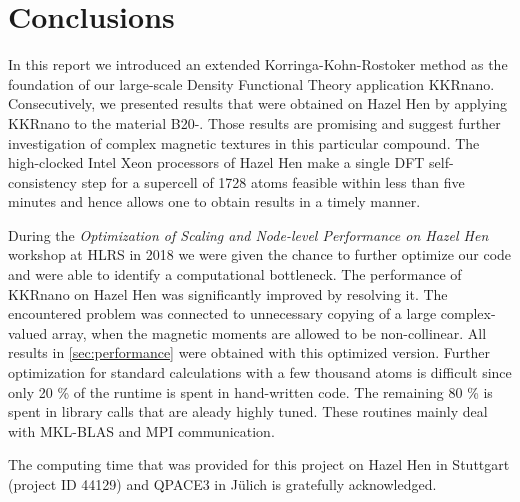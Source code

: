 \documentclass[graybox]{svmult}
\begin{document}
\section{Conclusions}
In this report we introduced an extended Korringa-Kohn-Rostoker method as the foundation of our large-scale
Density Functional Theory application KKRnano. 
Consecutively, we presented results that were obtained on Hazel Hen 
by applying KKRnano to the material B20-.
Those results are promising and suggest further investigation
of complex magnetic textures in this particular compound.
The high-clocked Intel Xeon processors of Hazel Hen
make a single DFT self-consistency step for a supercell of 1728 atoms feasible within 
less than five minutes and hence allows one
to obtain results in a timely manner.

During the
\textit{Optimization of Scaling and Node-level Performance on Hazel Hen} workshop at HLRS in 2018 we were
given the chance to further optimize our code and were able to identify a computational bottleneck. 
The performance of KKRnano on Hazel Hen was significantly improved by resolving it. The encountered problem was
connected to unnecessary copying of a large complex-valued array, when the magnetic moments are allowed to be
non-collinear.
All results in \cref{sec:performance} were
obtained with this optimized version.
Further optimization for standard calculations with a few thousand atoms 
is difficult since only 20 \% of the runtime is spent in hand-written code. The remaining 80 \% is spent in
library calls that are aleady highly tuned. These routines mainly deal with
MKL-BLAS and MPI communication.

%
\begin{acknowledgement}
The computing time that was provided for this project on Hazel Hen in Stuttgart (project ID 44129) and
QPACE3 in J\"ulich is gratefully acknowledged.
\end{acknowledgement}



\end{document}
